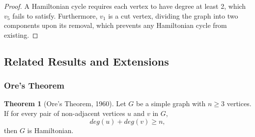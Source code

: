 \documentclass{article}
\theoremstyle{definition}
\def\deg{deg}%
\newtheorem{theorem}{Theorem}
\begin{document}
\begin{proof}
A Hamiltonian cycle requires each vertex to have degree at least 2, which $v_5$ fails to satisfy. Furthermore, $v_1$ is a cut vertex, dividing the graph into two components upon its removal, which prevents any Hamiltonian cycle from existing.
\end{proof}
\newpage
\subsection{Related Results and Extensions}
\subsubsection{Ore's Theorem}

\begin{theorem}[Ore's Theorem, 1960]
Let $G$ be a simple graph with $n \geq 3$ vertices. If for every pair of non-adjacent vertices $u$ and $v$ in $G$, 
\[\deg(u) + \deg(v) \geq n,\]
then $G$ is Hamiltonian.
\end{theorem}
\end{document}
